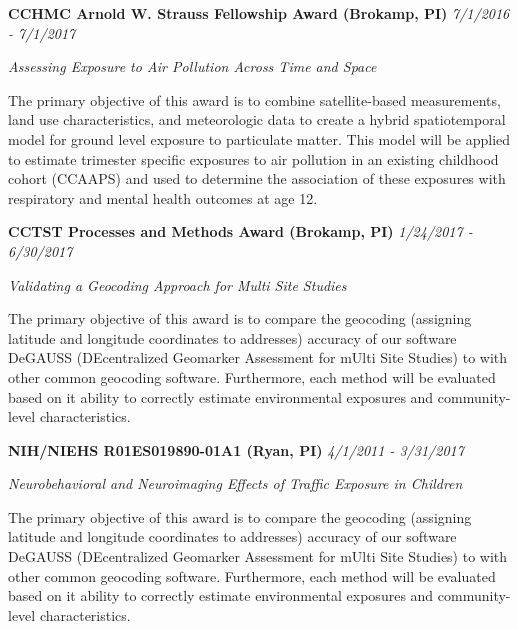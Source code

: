 \documentclass[margin,line]{res}
\newenvironment{list3}{
  \begin{list}{}{%
      \setlength{\itemsep}{0in}
      \setlength{\parsep}{0in} \setlength{\parskip}{0in}
      \setlength{\topsep}{0in} \setlength{\partopsep}{0in} 
      \setlength{\leftmargin}{0in}}}{\end{list}}
\begin{document}
\begin{resume}
\begin{list3} \itemsep 4pt
\item[] \textbf{CCHMC Arnold W. Strauss Fellowship Award (Brokamp, PI)} \hfill \textit{7/1/2016 - 7/1/2017}
\item[] \textit{Assessing Exposure to Air Pollution Across Time and Space}
\item[] The primary objective of this award is to combine satellite-based measurements, land use characteristics, and meteorologic data to create a hybrid spatiotemporal model for ground level exposure to particulate matter. This model will be applied to estimate trimester specific exposures to air pollution in an existing childhood cohort (CCAAPS) and used to determine the association of these exposures with respiratory and mental health outcomes at age 12.
\end{list3}

\vspace*{.1in}

\begin{list3} \itemsep 4pt
\item[] \textbf{CCTST Processes and Methods Award (Brokamp, PI)} \hfill \textit{1/24/2017 - 6/30/2017}
\item[] \textit{Validating a Geocoding Approach for Multi Site Studies}
\item[] The primary objective of this award is to compare the geocoding (assigning latitude and longitude coordinates to addresses) accuracy of our software DeGAUSS (DEcentralized Geomarker Assessment for mUlti Site Studies) to with other common geocoding software. Furthermore, each method will be evaluated based on it ability to correctly estimate environmental exposures and community-level characteristics.
\end{list3}

\vspace*{.1in}

\begin{list3} \itemsep 4pt
    \item[] \textbf{NIH/NIEHS R01ES019890-01A1 (Ryan, PI)} \hfill \textit{4/1/2011 - 3/31/2017}
\item[] \textit{Neurobehavioral and Neuroimaging Effects of Traffic Exposure in Children}
\item[] The primary objective of this award is to compare the geocoding (assigning latitude and longitude coordinates to addresses) accuracy of our software DeGAUSS (DEcentralized Geomarker Assessment for mUlti Site Studies) to with other common geocoding software. Furthermore, each method will be evaluated based on it ability to correctly estimate environmental exposures and community-level characteristics.
\end{list3}


\end{resume}
\end{document}
